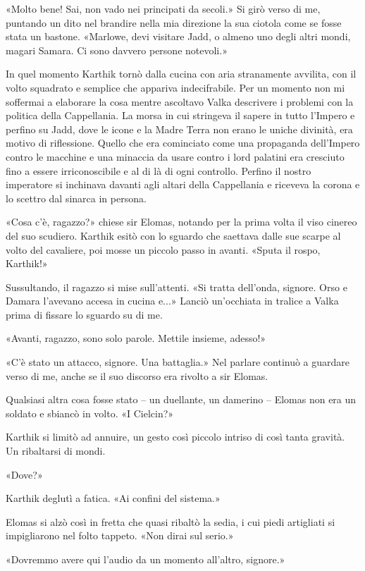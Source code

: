 «Molto bene! Sai, non vado nei principati da secoli.» Si girò verso di
me, puntando un dito nel brandire nella mia direzione la sua ciotola
come se fosse stata un bastone. «Marlowe, devi visitare Jadd, o almeno
uno degli altri mondi, magari Samara. Ci sono davvero persone notevoli.»

In quel momento Karthik tornò dalla cucina con aria stranamente
avvilita, con il volto squadrato e semplice che appariva indecifrabile.
Per un momento non mi soffermai a elaborare la cosa mentre ascoltavo
Valka descrivere i problemi con la politica della Cappellania. La morsa
in cui stringeva il sapere in tutto l'Impero e perfino su Jadd, dove le
icone e la Madre Terra non erano le uniche divinità, era motivo di
riflessione. Quello che era cominciato come una propaganda dell'Impero
contro le macchine e una minaccia da usare contro i lord palatini era
cresciuto fino a essere irriconoscibile e al di là di ogni controllo.
Perfino il nostro imperatore si inchinava davanti agli altari della
Cappellania e riceveva la corona e lo scettro dal sinarca in persona.

«Cosa c'è, ragazzo?» chiese sir Elomas, notando per la prima volta il
viso cinereo del suo scudiero. Karthik esitò con lo sguardo che saettava
dalle sue scarpe al volto del cavaliere, poi mosse un piccolo passo in
avanti. «Sputa il rospo, Karthik!»

Sussultando, il ragazzo si mise sull'attenti. «Si tratta dell'onda,
signore. Orso e Damara l'avevano accesa in cucina e...» Lanciò
un'occhiata in tralice a Valka prima di fissare lo sguardo su di me.

«Avanti, ragazzo, sono solo parole. Mettile insieme, adesso!»

«C'è stato un attacco, signore. Una battaglia.» Nel parlare continuò a
guardare verso di me, anche se il suo discorso era rivolto a sir Elomas.

Qualsiasi altra cosa fosse stato -- un duellante, un damerino -- Elomas
non era un soldato e sbiancò in volto. «I Cielcin?»

Karthik si limitò ad annuire, un gesto così piccolo intriso di così
tanta gravità. Un ribaltarsi di mondi.

«Dove?»

Karthik deglutì a fatica. «Ai confini del sistema.»

Elomas si alzò così in fretta che quasi ribaltò la sedia, i cui piedi
artigliati si impigliarono nel folto tappeto. «Non dirai sul serio.»

«Dovremmo avere qui l'audio da un momento all'altro, signore.»

